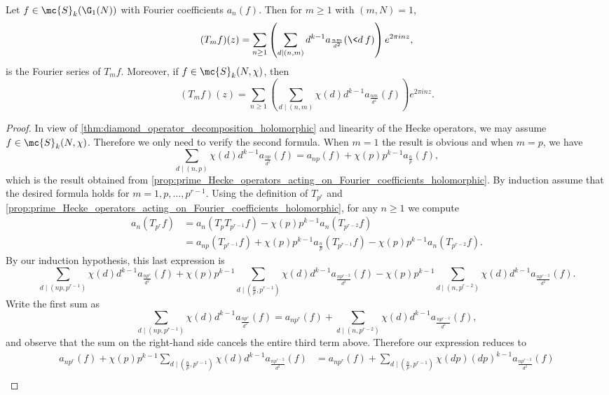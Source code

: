     \begin{proposition}\label{prop:general_Hecke_operators_acting_on_Fourier_coefficients_holomorphic}
      Let $f \in \mc{S}_{k}(\G_{1}(N))$ with Fourier coefficients $a_{n}(f)$. Then for $m \ge 1$ with $(m,N) = 1$,
      \[
        (T_{m}f)(z) = \sum_{n \ge 1}\left(\sum_{d \mid (n,m)}d^{k-1}a_{\frac{nm}{d^{2}}}(\<d\>f)\right)e^{2\pi inz},
      \]
      is the Fourier series of $T_{m}f$. Moreover, if $f \in \mc{S}_{k}(N,\chi)$, then
      \[
        (T_{m}f)(z) = \sum_{n \ge 1}\left(\sum_{d \mid (n,m)}\chi(d)d^{k-1}a_{\frac{nm}{d^{2}}}(f)\right)e^{2\pi inz}.
      \]
    \end{proposition}
    \begin{proof}
      In view of \cref{thm:diamond_operator_decomposition_holomorphic} and linearity of the Hecke operators, we may assume $f \in \mc{S}_{k}(N,\chi)$. Therefore we only need to verify the second formula. When $m = 1$ the result is obvious and when $m = p$, we have
      \[
        \sum_{d \mid (n,p)}\chi(d)d^{k-1}a_{\frac{np}{d^{2}}}(f) = a_{np}(f)+\chi(p)p^{k-1}a_{\frac{n}{p}}(f),
      \]
      which is the result obtained from \cref{prop:prime_Hecke_operators_acting_on_Fourier_coefficients_holomorphic}. By induction assume that the desired formula holds for $m = 1,p,\ldots,p^{r-1}$. Using the definition of $T_{p^{r}}$ and \cref{prop:prime_Hecke_operators_acting_on_Fourier_coefficients_holomorphic}, for any $n \ge 1$ we compute
      \begin{align*}
        a_{n}(T_{p^{r}}f) &= a_{n}(T_{p}T_{p^{r-1}}f)-\chi(p)p^{k-1}a_{n}(T_{p^{r-2}}f) \\
        &= a_{np}(T_{p^{r-1}}f)+\chi(p)p^{k-1}a_{\frac{n}{p}}(T_{p^{r-1}}f)-\chi(p)p^{k-1}a_{n}(T_{p^{r-2}}f).
      \end{align*}
      By our induction hypothesis, this last expression is
      \[
        \sum_{d \mid (np,p^{r-1})}\chi(d)d^{k-1}a_{\frac{np^{r}}{d^{2}}}(f)+\chi(p)p^{k-1}\sum_{d \mid \left(\frac{n}{p},p^{r-1}\right)}\chi(d)d^{k-1}a_{\frac{np^{r-2}}{d^{2}}}(f)-\chi(p)p^{k-1}\sum_{d \mid (n,p^{r-2})}\chi(d)d^{k-1}a_{\frac{np^{r-2}}{d^{2}}}(f).
      \]
      Write the first sum as
      \[
        \sum_{d \mid (np,p^{r-1})}\chi(d)d^{k-1}a_{\frac{np^{r}}{d^{2}}}(f) = a_{np^{r}}(f)+\sum_{d \mid (n,p^{r-2})}\chi(d)d^{k-1}a_{\frac{np^{r-2}}{d^{2}}}(f),
      \]
      and observe that the sum on the right-hand side cancels the entire third term above. Therefore our expression reduces to
      \begin{align*}
        a_{np^{r}}(f)+\chi(p)p^{k-1}\sum_{d \mid \left(\frac{n}{p},p^{r-1}\right)}\chi(d)d^{k-1}a_{\frac{np^{r-2}}{d^{2}}}(f) &= a_{np^{r}}(f)+\sum_{d \mid \left(\frac{n}{p},p^{r-1}\right)}\chi(dp)(dp)^{k-1}a_{\frac{np^{r-2}}{d^{2}}}(f) \\

\end{align*}
\end{proof}
